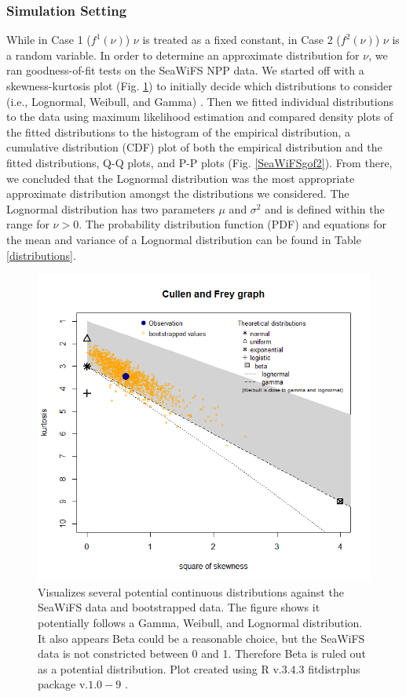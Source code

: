 \documentclass[oneside,12pt,final]{sty/ucthesis-CA2012}
\let\cite\citep                             %
\begin{document}
\begin{mainmatter}
\subsubsection{Simulation Setting}
While in Case 1 ($f^1(\nu)$) $\nu$ is treated as a fixed constant, in Case 2 ($f^2(\nu)$) $\nu$ is a random variable. In order to determine an approximate distribution for $\nu$, we ran goodness-of-fit tests on the SeaWiFS NPP data. We started off with a skewness-kurtosis plot (Fig. \ref{SeaWiFSgof}) to initially decide which distributions to consider (i.e., Lognormal, Weibull, and Gamma) \cite{fitdistrplus}. Then we fitted individual distributions to the data using maximum likelihood estimation and compared density plots of the fitted distributions to the histogram of the empirical distribution, a cumulative distribution (CDF) plot of both the empirical distribution and the fitted distributions, Q-Q plots, and P-P plots (Fig. \ref{SeaWiFSgof2}). From there, we concluded that the Lognormal distribution was the most appropriate approximate distribution amongst the distributions we considered. The Lognormal distribution has two parameters $\mu$ and $\sigma^2$ and is defined within the range for $\nu > 0$. The probability distribution function (PDF) and equations for the mean and variance of a Lognormal distribution can be found in Table \ref{distributions}.

\begin{figure}[H]
     \centering
       \includegraphics[width=.7\textwidth]{fig/Scen2gof}
    \caption{Visualizes several potential continuous distributions against the SeaWiFS data and bootstrapped data. The figure shows it potentially follows a Gamma, Weibull, and Lognormal distribution. It also appears Beta could be a reasonable choice, but the SeaWiFS data is not constricted between 0 and 1. Therefore Beta is ruled out as a potential distribution. Plot created using R v.3.4.3 \cite{Rcite} fitdistrplus package v.$1.0-9$ \cite{fitdistrplus}. }
    \label{SeaWiFSgof}
\end{figure}


\end{mainmatter}
\end{document}

